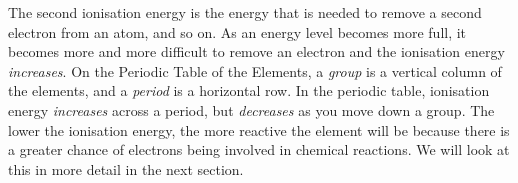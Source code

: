 

      \label{m38757*id261083}The second ionisation energy is the energy that is needed to remove a second electron from an atom, and so on. As an energy level becomes more full, it becomes more and more difficult to remove an electron and the ionisation energy \textsl{increases}. On the Periodic Table of the Elements, a \textsl{group} is a vertical column of the elements, and a \textsl{period} is a horizontal row. In the periodic table, ionisation energy \textsl{increases} across a period, but \textsl{decreases} as you move down a group. The lower the ionisation energy, the more reactive the element will be because there is a greater chance of electrons being involved in chemical reactions. We will look at this in more detail in the next section.\par 
\label{m38757*eip-865}

